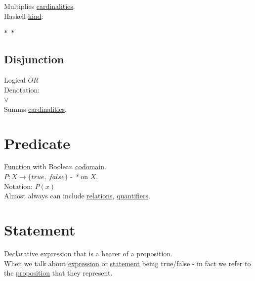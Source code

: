 \documentclass[a4paper,14pt,oneside]{book}
\begin{document}
Multiplies \hyperref[org81b6929]{cardinalities}.\\

Haskell \hyperref[orgfd91f52]{kind}:\\
\begin{verbatim}
* *
\end{verbatim}

\subsection{\label{org3cc0104}Disjunction}
\label{sec:org522a841}
Logical \(OR\)\\
Denotation:\\
\(\lor\)\\

Summs \hyperref[org81b6929]{cardinalities}.\\

\section{\label{org5391aed}Predicate}
\label{sec:orge3c27b9}
\hyperref[org39271b2]{Function} with Boolean \hyperref[org716e23e]{codomain}.\\
\(P: X \to \{ true, \ false \}\) - \emph{*} on \(X\).\\

Notation: \(P(x)\)\\

Almost always can include \hyperref[orgd960451]{relations}, \hyperref[orgdd911c2]{quantifiers}.\\

\section{\label{orgeb7c6c6}Statement}
\label{sec:orgc0af249}
Declarative \hyperref[org4eaaefd]{expression} that is a bearer of a \hyperref[orgd0fcab0]{proposition}.\\

When we talk about \hyperref[org4eaaefd]{expression} or \hyperref[orgeb7c6c6]{statement} being true/false - in fact we refer to the \hyperref[orgd0fcab0]{proposition} that they represent.\\
\end{document}

